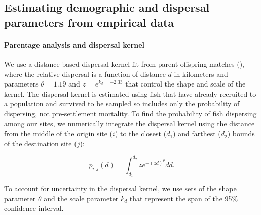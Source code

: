 \documentclass[12pt, oneside]{article}   	%
\begin{document}
\subsection*{Estimating demographic and dispersal parameters from empirical data} 

\paragraph*{Parentage analysis and dispersal kernel}  %

We use a distance-based dispersal kernel fit from parent-offspring matches (\citep{catalanoInPrepconnectivity}), where the relative dispersal is a function of distance $d$ in kilometers and parameters $\theta = 1.19$ and $z = e^{k_d = -2.33}$ that control the shape and scale of the kernel. The dispersal kernel is estimated using fish that have already recruited to a population and survived to be sampled so includes only the probability of dispersing, not pre-settlement mortality. To find the probability of fish dispersing among our sites, we numerically integrate the dispersal kernel using the distance from the middle of the origin site ($i$) to the closest ($d_1$) and farthest ($d_2$) bounds of the destination site ($j$):

\begin{equation} %
p_{i, j}(d) = \int_{d_1}^{d_2} z e^{-(zd)^\theta}  dd. \label{EQN_integratingDK}
\end{equation}

To account for uncertainty in the dispersal kernel, we use sets of the shape parameter $\theta$ and the scale parameter $k_d$ that represent the span of the 95\% confidence interval.

\end{document}
